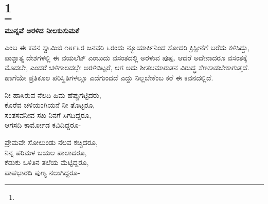 \selecteng

\chapter[TO AN EARLY VIOLET]{\protect\footnote{}}

\begin{myquote}
\end{myquote}

\selectkan

\begin{center}
\textbf{ಮುನ್ನವೆ ಅರಳಿದ ನೀಲಕುಸುಮಕೆ}
\end{center}

 ಎಂಬ ಈ ಕವನ ಸ್ವಾಮಿಜಿ ೧೮೯೬ರ ಜನವರಿ ೬ರಂದು ನ್ಯೂಯಾರ್ಕಿನಿಂದ ಸೋದರಿ ಕ್ರಿಸ್ಟೀನೆಗೆ ಬರೆದು ಕಳಿಸಿದ್ದು, ಪಾಶ್ಚಾತ್ಯ ದೇಶಗಳಲ್ಲಿ ಈ ವಯಲೆಟ್ ಎಂಬುದು ವಸಂತದಲ್ಲಿ ಅರಳುವ ಪುಷ್ಪ. ಆದರೆ ಅದೇನಾದರೂ ವಸಂತಕ್ಕೆ ಮೊದಲೇ, ಎಂದರೆ ಚಳಿಗಾಲದಲ್ಲೇ ಅರಳಿಬಿಟ್ಟರೆ, ಆಗ ಅದು ಶೀತಲಮಾರುತನ ವಿರುದ್ಧ ಸೆಣಸಾಡಬೇಕಾಗುತ್ತದೆ. ಹಾಗೆಯೇ ಪ್ರತಿಕೂಲ ಪರಿಸ್ಥಿತಿಗಳಲ್ಲೂ ಎದೆಗುಂದದೆ ಎದ್ದು ನಿಲ್ಲಬೇಕೆಂಬ ಕರೆ ಈ ಕವನದಲ್ಲಿದೆ.

\begin{myquote}
ನೀ ಹಾಸಿರುವ ನೆಲದಿ ಹಿಮ ಹೆಪ್ಪುಗಟ್ಟಿದರು,\\ಕೊರೆವ ಚಳಿಯಂಗಿಯನೆ ನೀ ತೊಟ್ಟರೂ,\\ಸಂತಸವನೀವ ಸಖ ನಿನಗೆ ಸಿಗದಿದ್ದರೂ,\\ಆಗಸದಿ ಕಾರ್ಮೋಡ ಕವಿದಿದ್ದರೂ-
\end{myquote}

\begin{myquote}
ಪ್ರೇಮವೇ ಸೋಲುಂಡು ನೆಲವ ಕಚ್ಚಿದರೂ,\\ನಿನ್ನ ಪರಿಮಳ ಬಯಲ ಪಾಲಾದರೂ,\\ಕೆಡುಕು ಒಳಿತಿನ ತಲೆಯ ಮೆಟ್ಟಿದ್ದರೂ,\\ಪಾಪಭಾರದಿ ಪುಣ್ಯ ನಲುಗಿದ್ದರೂ-
\end{myquote}

